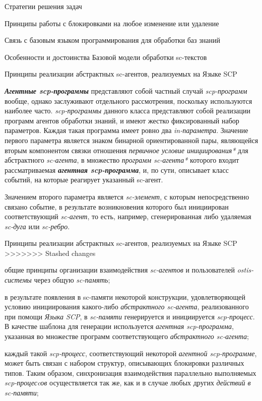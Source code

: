 \begin{frame}{Стратегии решения задач}
\begin{frame}{\large Принципы работы с блокировками на любое изменение или удаление}
\begin{frame}{Связь с базовым языком программирования для обработки баз
знаний}
\begin{frame}{Особенности и достоинства Базовой модели обработки sc-текстов}
\begin{frame}{\large Принципы реализации абстрактных sc-агентов, реализуемых на Языке SCP}
\begin{frame}{}
\textbf{\textit{Агентные scp-программы}} представляют собой частный случай \textit{scp-программ} вообще, однако заслуживают отдельного рассмотрения, поскольку используются наиболее часто. \textit{scp-программы} данного класса представляют собой реализации программ агентов обработки знаний, и имеют жестко фиксированный набор параметров. Каждая такая программа имеет ровно два \textit{in-параметра\scnrolesign}. Значение первого параметра является знаком бинарной ориентированной пары, являющейся вторым компонентом связки отношения \textit{первичное условие инициирования*} для абстрактного \textit{sc-агента}, в множество \textit{программ sc-агента*} которого входит рассматриваемая \textbf{\textit{агентная scp-программа}}, и, по сути, описывает класс событий, на которые реагирует указанный sc-агент.
	
Значением второго параметра является \textit{sc-элемент}, с которым непосредственно связано событие, в результате возникновения которого был инициирован соответствующий \textit{sc-агент}, то есть, например, сгенерированная либо удаляемая \textit{sc-дуга} или \textit{sc-ребро}.
\end{frame}

\begin{frame}{Принципы реализации абстрактных sc-агентов, реализуемых на Языке SCP}
\topline
\vspace{30}
 \\

>>>>>>> Stashed changes
    \begin{textitemize}
    \item общие принципы организации взаимодействия \textit{sc-агентов} и пользователей \textit{ostis-системы} через общую \textit{sc-память};
\item в результате появления в sc-памяти некоторой конструкции, удовлетворяющей условию инициирования какого-либо \textit{абстрактного sc-агента}, реализованного при помощи \textit{Языка SCP}, в \textit{sc-памяти} генерируется и инициируется \textit{scp-процесс}. В качестве шаблона для генерации используется \textit{агентная scp-программа}, указанная во множестве программ соответствующего \textit{абстрактного sc-агента};
\item каждый такой \textit{scp-процесс}, соответствующий некоторой \textit{агентной scp-программе}, может быть связан с набором структур, описывающих блокировки различных типов. Таким образом, синхронизация взаимодействия параллельно выполняемых \textit{scp-процесcов} осуществляется так же, как и в случае любых других \textit{действий в sc-памяти};
\end{textitemize}
\end{frame}


\end{frame}
\end{frame}
\end{frame}
\end{frame}
\end{frame}
